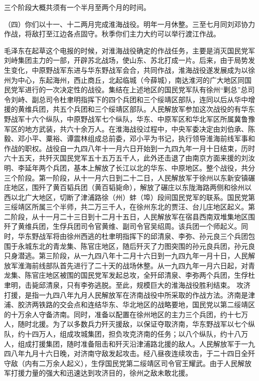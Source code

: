 三个阶段大概共须有一个半月至两个月的时间。

（四）你们以十一、十二两月完成淮海战役。明年一月休整。三至七月同刘邓协力作战，将敌打至江边各点固守。秋季你们主力大约可以举行渡江作战。


\begin{maonote}
毛泽东在起草这个电报的时候，对淮海战役确定的作战任务，主要是消灭国民党军刘峙集团主力的一部，开辟苏北战场，使山东、苏北打成一片。后来，由于局势发生变化，中原野战军东进与华东野战军会合，共同作战，淮海战役遂发展成为以徐州为中心，东起海州，西止商丘，北起临城（今薛城），南达淮河的广大地区同国民党军进行的一次决定性的战役。集结在上述地区的国民党军队有徐州“剿总”总司令刘峙、副总司令杜聿明指挥下的四个兵团和三个绥靖区部队，连同以后从华中增援的黄维兵团，共五个兵团和三个绥靖区部队。人民解放军参加这次战役的有华东野战军十六个纵队，中原野战军七个纵队，华东、中原军区和华北军区所属冀鲁豫军区的地方武装，共六十余万人。在淮海战役过程中，中央军委决定由刘伯承、陈毅、邓小平、粟裕、谭震林组成总前委，邓小平为书记，执行领导淮海前线军事和作战的职权。战役自一九四八年十一月六日开始到一九四九年一月十日结束，历时六十五天，共歼灭国民党军五十五万五千人，此外还击退了由南京方面来援的刘汝明、李延年两个兵团，基本上解放了长江以北的华东、中原地区。整个战役，共分三个阶段。第一阶段，从十一月六日到二十二日，人民解放军于徐州以东新安镇碾庄地区，围歼了黄百韬兵团（黄百韬毙命），解放了碾庄以东陇海路两侧和徐州以西以北广大地区，切断了津浦路徐（州）蚌（埠）段间国民党军的联系。国民党第三绥靖区所属三个半师，共二万三千人，在徐州东北的贾汪、台儿庄地区起义。第二阶段，从十一月二十三日到十二月十五日，人民解放军在宿县西南双堆集地区围歼了黄维兵团，生俘兵团司令官黄维、副司令官吴绍周。该兵团一个师起义。同时，华东野战军将由徐州西逃的杜聿明指挥下的邱清泉、李弥、孙元良三个兵团包围于永城东北的青龙集、陈官庄地区，随后歼灭了力图突围的孙元良兵团，孙元良只身潜逃。第三阶段，从一九四八年十二月十六日到一九四九年一月十日，人民解放军淮海前线部队首先进行了二十天的战场休整。从一九四九年一月六日起，对青龙集、陈官庄地区被围的国民党军发起总攻，全歼邱清泉、李弥两个兵团，生俘杜聿明，击毙邱清泉，只有李弥逃脱。至此，规模巨大的淮海战役胜利结束。
攻济打援，是指一九四八年九月人民解放军在济南战役中所采取的作战方法。济南是津浦、胶济两铁路的交会点和连结华东、华北地区的战略要地，国民党以第二绥靖区的十万余人守备济南。同时，准备以配置在徐州地区的主力三个兵团，约十七万人，随时北援。为了以多数兵力歼灭援敌，以保证夺取济南，华东野战军以七个纵队，约十四万人，组成攻城集团，担负攻克济南的任务；以八个纵队，约十八万人，组成打援集团，随时准备阻击和歼灭沿津浦路北援的敌人。人民解放军于一九四八年九月十六日晚，对济南守敌发起攻击。经八昼夜连续攻击，于二十四日全歼守敌（内有二万余人起义），生俘国民党第二绥靖区司令官王耀武。由于人民解放军打援力量的强大和迅速达到攻济目的，徐州之敌未敢北援。

\end{maonote}
